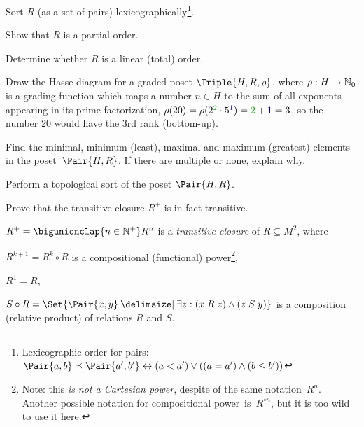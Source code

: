 \documentclass[a4paper,12pt]{article}
\begin{document}
\begin{tasks}
    \begin{subtasks}
        \item Sort $R$ (as a set of pairs) lexicographically\footnote{Lexicographic order for pairs: $\Pair{a,b} \preceq \Pair{a',b'} \iff (a < a') \lor ((a = a') \land (b \leq b'))$}.

        \item Show that $R$ is a partial order.

        \item Determine whether $R$ is a linear (total) order.

        \item Draw the Hasse diagram for a graded poset $\Triple{H, R, \rho}$, where $\rho : H \to \mathbb{N}_{0}$ is a grading function which maps a number $n \in H$ to the sum of all exponents appearing in its prime factorization, \eg $\rho(20) = \rho(2^{\mathcolor{my-green}{2}} \cdot 5^{\textcolor{my-blue}{1}}) = \mathcolor{my-green}{2} + \textcolor{my-blue}{1} = 3$, so the number 20 would have the 3rd rank (bottom-up).

        \item Find the minimal, minimum (least), maximal and maximum (greatest) elements in the poset~$\Pair{H, R}$.
        If there are multiple or none, explain why.

        \item Perform a topological sort of the poset $\Pair{H, R}$.
    \end{subtasks}


    \item Prove that the transitive closure $R^{+}$ is in fact transitive.

    \begin{definition}
        $R^{+} = \bigunionclap{n \in \NaturalPlus} R^n$ is a \textit{transitive closure} of $R \subseteq M^2$, where
        \begin{terms}
            \item $R^{k+1} = R^k \circ R$ is a compositional (functional) power\footnote{Note: this \emph{is not a Cartesian power}, despite of the same notation~$R^n$. Another possible notation for compositional power~is~$R^{\circ n}$, but it is too wild to use it here.},
            \item $R^1 = R$,
            \item $S \circ R = \Set{\Pair{x,y} \given \exists z : (x \rel[R] z) \land (z \rel[S] y)}$ is a composition (relative product) of relations $R$ and $S$.
        \end{terms}
    \end{definition}



\end{tasks}
\end{document}
